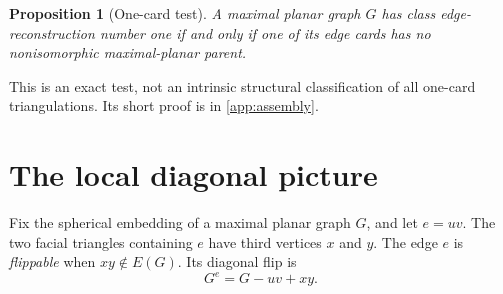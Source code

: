 \documentclass[11pt]{article}
\newtheorem{proposition}[theorem]{Proposition}
\theoremstyle{definition}
\theoremstyle{remark}
\begin{document}
\begin{proposition}[One-card test]\label{prop:one-card-test}
A maximal planar graph \(G\) has class edge-reconstruction number one if and
only if one of its edge cards has no nonisomorphic maximal-planar parent.
\end{proposition}

This is an exact test, not an intrinsic structural classification of all
one-card triangulations.  Its short proof is in \cref{app:assembly}.

\section{The local diagonal picture}

Fix the spherical embedding of a maximal planar graph \(G\), and let
\(e=uv\).  The two facial triangles containing \(e\) have third vertices
\(x\) and \(y\).  The edge \(e\) is \emph{flippable} when \(xy\notin E(G)\).
Its diagonal flip is
\[
                    G^e=G-uv+xy.
\]
\end{document}
